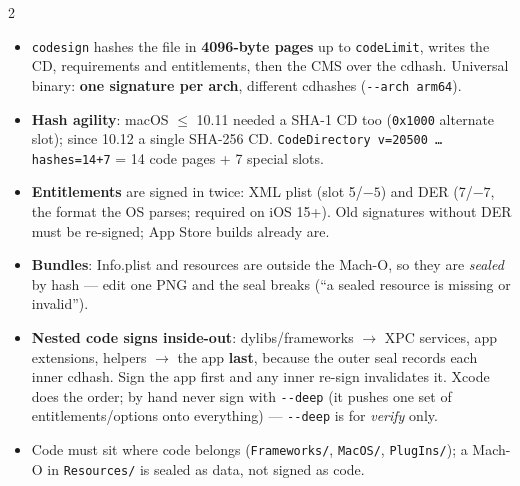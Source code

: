 \documentclass[8pt]{extarticle}
\newcommand\ct[1]{\texttt{#1}}
\newcommand\dd{\hbox{-}\hbox{-}}   %
\newcommand\hd[1]{\par\vspace{2pt}\noindent{\bfseries\color{sheetBlue}#1}\par\vspace{1pt}}
\begin{document}

\begin{multicols}{2}
\raggedright{}

\hd{Signing}
\begin{itemize}
  \item \ct{codesign} hashes the file in \textbf{4096-byte pages} up to \ct{codeLimit}, writes
        the CD, requirements and entitlements, then the CMS over the cdhash. Universal binary:
        \textbf{one signature per arch}, different cdhashes (\ct{\dd arch arm64}).
  \item \textbf{Hash agility}: macOS $\leq$ 10.11 needed a SHA-1 CD too (\ct{0x1000} alternate
        slot); since 10.12 a single SHA-256 CD. \ct{CodeDirectory v=20500 … hashes=14+7} =
        14 code pages + 7 special slots.
  \item \textbf{Entitlements} are signed in twice: XML plist (slot 5/$-5$) and DER
        (7/$-7$, the format the OS parses; required on iOS 15+\unverified). Old signatures without
        DER must be re-signed; App Store builds already are.
  \item \textbf{Bundles}: Info.plist and resources are outside the Mach-O, so they are
        \emph{sealed} by hash — edit one PNG and the seal breaks
        (``a sealed resource is missing or invalid'').
  \item \textbf{Nested code signs inside-out}: dylibs/frameworks $\to$ XPC services, app
        extensions, helpers $\to$ the app \textbf{last}, because the outer seal records each
        inner cdhash. Sign the app first and any inner re-sign invalidates it. Xcode does the
        order; by hand never sign with \ct{\dd deep} (it pushes one set of entitlements/options
        onto everything) — \ct{\dd deep} is for \emph{verify} only.
  \item Code must sit where code belongs (\ct{Frameworks/}, \ct{MacOS/}, \ct{PlugIns/}); a Mach-O
        in \ct{Resources/} is sealed as data, not signed as code.
\end{itemize}


\end{multicols}
\end{document}
